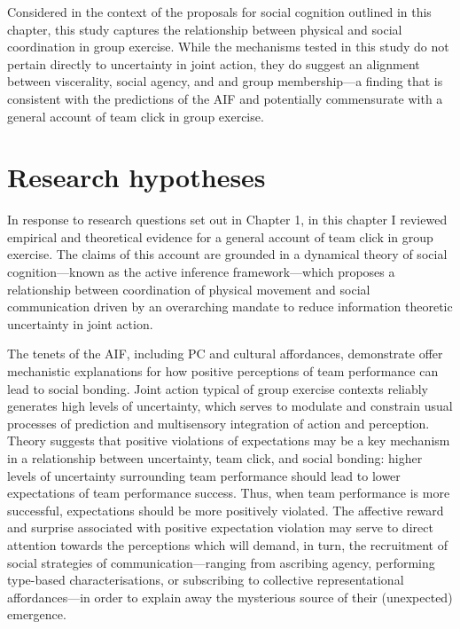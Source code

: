 \begin{CJK}{UTF8}{gbsn}
Considered in the context of the proposals for social cognition outlined in this chapter, this study captures the relationship between physical and social coordination in group exercise.  While the mechanisms tested in this study do not pertain directly to uncertainty in joint action, they do suggest an alignment between viscerality, social agency, and and group membership—a finding that is consistent with the predictions of the AIF and  potentially commensurate with a general account of team click in group exercise.

\section{Research hypotheses}
In response to research questions set out in Chapter 1, in this chapter I reviewed empirical and theoretical evidence for a general account of team click in group exercise. The claims of this account are grounded in a dynamical theory of social cognition---known as the active inference framework---which proposes a relationship between coordination of physical movement and social communication driven by an overarching mandate to reduce information theoretic uncertainty in joint action.

The tenets of the AIF, including PC and cultural affordances, demonstrate offer mechanistic explanations for how positive perceptions of team performance can lead to social bonding. Joint action typical of group exercise contexts reliably generates high levels of uncertainty, which serves to modulate and constrain usual processes of prediction and multisensory integration of action and perception.  Theory suggests that positive violations of expectations may be a key mechanism in a relationship between uncertainty, team click, and social bonding: higher levels of uncertainty surrounding team performance should lead to lower expectations of team performance success.  Thus, when team performance is more successful, expectations should be more positively violated.  The affective reward and surprise associated with positive expectation violation may serve to direct attention towards the perceptions which will demand, in turn, the recruitment of social strategies of communication---ranging from ascribing agency, performing type-based characterisations, or subscribing to collective representational affordances---in order to explain away the mysterious source of their (unexpected) emergence.





\end{CJK}
